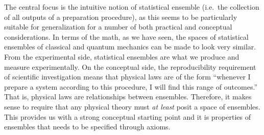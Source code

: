 

The central focus is the intuitive notion of statistical ensemble (i.e.~the collection of all outputs of a preparation procedure), as this seems to be particularly suitable for generalization for a number of both practical and conceptual considerations. In terms of the math, as we have seen, the spaces of statistical ensembles of classical and quantum mechanics can be made to look very similar. From the experimental side, statistical ensembles are what we produce and measure experimentally. On the conceptual side, the reproducibility requirement of scientific investigation means that physical laws are of the form ``whenever I prepare a system according to this procedure, I will find this range of outcomes.'' That is, physical laws are relationships between ensembles. Therefore, it makes sense to require that any physical theory must \emph{at least} posit a space of ensembles. This provides us with a strong conceptual starting point and it is properties of ensembles that needs to be specified through axioms.


